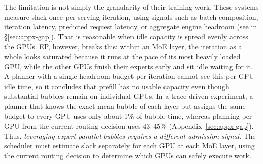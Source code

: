 The limitation is not simply the granularity of their training work.
These systems measure slack once per serving iteration, using signals such as batch composition, iteration latency, predicted request latency, or aggregate engine headroom (see  in \S\ref{sec:appx-gap}).
That is reasonable when idle capacity is spread evenly across the GPUs.
\ac{EP}, however, breaks this: within an \ac{MoE} layer, the iteration as a whole looks saturated because it runs at the pace of its most heavily loaded GPU, while the other GPUs finish their experts early and sit idle waiting for it.
A planner with a single headroom budget per iteration cannot see this per-GPU idle time, so it concludes that prefill has no usable capacity even though substantial bubbles remain on individual GPUs. In a trace-driven experiment, a planner that knows the exact mean bubble of each layer but assigns the same budget to every GPU uses only about 1\% of bubble time, whereas planning per GPU from the current routing decision uses 43--45\% (Appendix~\ref{sec:appx-gap}).
Thus, \emph{leveraging expert-parallel bubbles requires a different admission signal}.
The scheduler must estimate slack separately for each GPU at each \ac{MoE} layer, using the current routing decision to determine which GPUs can safely execute work.
